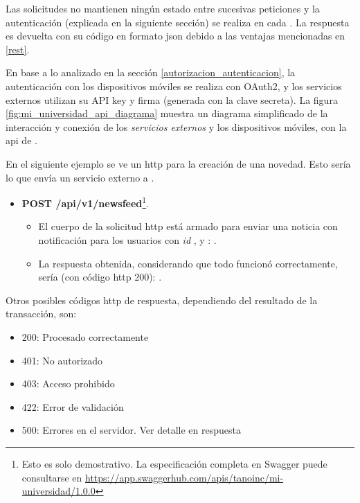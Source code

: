 Las solicitudes no mantienen ningún estado entre sucesivas peticiones y la autenticación (explicada en la siguiente sección) se realiza en cada . La respuesta es devuelta con su código en formato \gls{json} debido a las ventajas mencionadas en \ref{rest}.

En base a lo analizado en la sección \ref{autorizacion_autenticacion}, la autenticación con los dispositivos móviles se realiza con OAuth2, y los servicios externos utilizan su API key y firma (generada con la clave secreta). La figura \ref{fig:mi_universidad_api_diagrama} muestra un diagrama simplificado de la interacción y conexión de los \textit{servicios externos} y los dispositivos móviles, con la \gls{api} de \nombreApp{}. 


En el siguiente ejemplo se ve un  \gls{http} para la creación de una novedad. Esto sería lo que envía un servicio externo a \nombreApp{}.
\begin{itemize}
\item \textbf{POST /api/v1/newsfeed}\footnote{Esto es solo demostrativo. La especificación completa en Swagger puede consultarse en \url{https://app.swaggerhub.com/apis/tanoinc/mi-universidad/1.0.0}}.
\begin{itemize}
\item El cuerpo de la solicitud \gls{http} está armado para enviar una noticia con notificación  para los usuarios con \textit{id} ,  y :
\begingroup
  .\label{codigo_post_newsfeed_solicitud}
\endgroup

\item La respuesta obtenida, considerando que todo funcionó correctamente, sería (con código \gls{http} 200):
\begingroup
  .\label{codigo_post_newsfeed_respuesta}
\endgroup
\end{itemize}
\end{itemize}

Otros posibles códigos \gls{http} de respuesta, dependiendo del resultado de la transacción, son:
\begin{itemize}
\item 200:
Procesado correctamente
\item 401:
No autorizado
\item 403:
Acceso prohibido
\item 422:
Error de validación
\item 500:
Errores en el servidor. Ver detalle en respuesta
\end{itemize}

